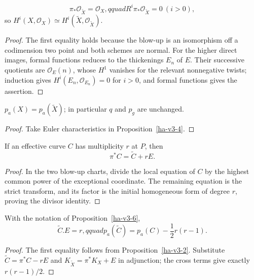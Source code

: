 \begin{proposition}
\label{ha-v3-4}
\[
 \pi_*\mathcal O_{\widetilde X}=\mathcal O_X,qquad
 R^i\pi_*\mathcal O_{\widetilde X}=0\ (i>0),
\]
so \(H^i(X,\mathcal O_X)\simeq H^i(\widetilde X,\mathcal O_{\widetilde X})\).

\end{proposition}
\begin{proof}
The first equality holds because the blow-up is an isomorphism off a codimension
two point and both schemes are normal.  For the higher direct images, formal
functions reduces to the thickenings \(E_n\) of \(E\).  Their successive
quotients are \(\mathcal O_E(n)\), whose \(H^1\) vanishes for the relevant
nonnegative twists; induction gives \(H^i(E_n,\mathcal O_{E_n})=0\) for
\(i>0\), and formal functions gives the assertion.
\end{proof}

\begin{corollary}
\label{ha-v3-5}
\(p_a(X)=p_a(\widetilde X)\); in particular \(q\) and \(p_g\) are unchanged.
\end{corollary}
\begin{proof}
Take Euler characteristics in Proposition~\ref{ha-v3-4}.
\end{proof}

\begin{proposition}
\label{ha-v3-6}
If an effective curve \(C\) has multiplicity \(r\) at \(P\), then
\[
 \pi^*C=\widetilde C+rE.
\]

\end{proposition}
\begin{proof}
In the two blow-up charts, divide the local equation of \(C\) by the highest
common power of the exceptional coordinate.  The remaining equation is the
strict transform, and its factor is the initial homogeneous form of degree
\(r\), proving the divisor identity.
\end{proof}

\begin{corollary}
\label{ha-v3-7}
With the notation of Proposition~\ref{ha-v3-6},
\[
 \widetilde C.E=r,qquad p_a(\widetilde C)=p_a(C)-\frac12r(r-1).
\]
\end{corollary}
\begin{proof}
The first equality follows from Proposition~\ref{ha-v3-2}.  Substitute
\(\widetilde C=\pi^*C-rE\) and \(K_{\widetilde X}=\pi^*K_X+E\) in adjunction;
the cross terms give exactly \(r(r-1)/2\).
\end{proof}

